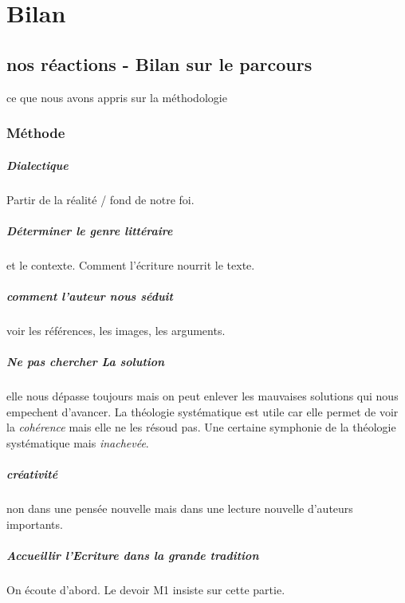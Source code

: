 \chapter{Bilan}


\section{nos réactions - Bilan sur le parcours}
ce que nous avons appris sur la méthodologie


\subsection{Méthode}

\paragraph{Dialectique} Partir de la réalité / fond de notre foi.

\paragraph{Déterminer le genre littéraire} et le contexte. Comment l'écriture nourrit le texte.

\paragraph{comment l'auteur nous séduit} voir les références, les images, les arguments. 

\paragraph{Ne pas chercher La solution} elle nous dépasse toujours mais on peut enlever les mauvaises solutions qui nous empechent d'avancer. La théologie systématique est utile car elle permet de voir la \textit{cohérence} mais elle ne les résoud pas. Une certaine symphonie de la théologie systématique mais \textit{inachevée}. 

\paragraph{créativité} non dans une pensée nouvelle mais dans une lecture nouvelle d'auteurs importants.

\paragraph{Accueillir l'Ecriture dans la grande tradition} On écoute d'abord. Le devoir M1 insiste sur cette partie.

